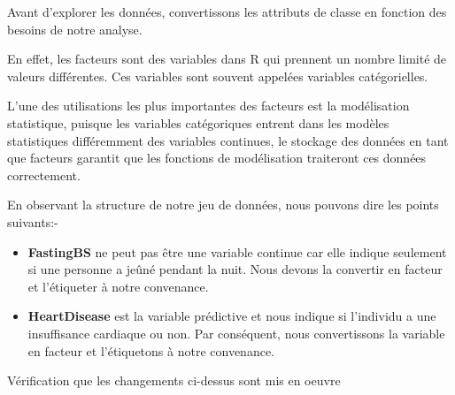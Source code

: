 \documentclass[
]{article}
\newenvironment{Shaded}{\begin{snugshade}}{\end{snugshade}}
\newcommand{\FunctionTok}[1]{\textcolor[rgb]{0.00,0.00,0.00}{#1}}
\newcommand{\NormalTok}[1]{#1}
\newcommand{\OtherTok}[1]{\textcolor[rgb]{0.56,0.35,0.01}{#1}}
\newcommand{\SpecialCharTok}[1]{\textcolor[rgb]{0.00,0.00,0.00}{#1}}
\newcommand{\StringTok}[1]{\textcolor[rgb]{0.31,0.60,0.02}{#1}}
\begin{document}
Avant d'explorer les données, convertissons les attributs de classe en
fonction des besoins de notre analyse.

En effet, les facteurs sont des variables dans R qui prennent un nombre
limité de valeurs différentes. Ces variables sont souvent appelées
variables catégorielles.

L'une des utilisations les plus importantes des facteurs est la
modélisation statistique, puisque les variables catégoriques entrent
dans les modèles statistiques différemment des variables continues, le
stockage des données en tant que facteurs garantit que les fonctions de
modélisation traiteront ces données correctement.

En observant la structure de notre jeu de données, nous pouvons dire les
points suivants:-

\begin{itemize}
\item
  \textbf{FastingBS} ne peut pas être une variable continue car elle
  indique seulement si une personne a jeûné pendant la nuit. Nous devons
  la convertir en facteur et l'étiqueter à notre convenance.
\item
  \textbf{HeartDisease} est la variable prédictive et nous indique si
  l'individu a une insuffisance cardiaque ou non. Par conséquent, nous
  convertissons la variable en facteur et l'étiquetons à notre
  convenance.
\end{itemize}

\begin{Shaded}
\end{Shaded}

Vérification que les changements ci-dessus sont mis en oeuvre
\end{document}
